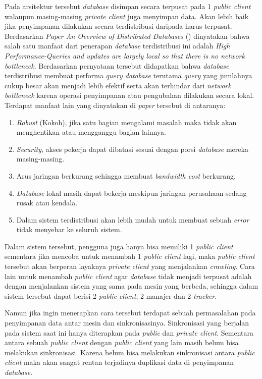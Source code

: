 Pada arsitektur tersebut \emph{database} disimpan secara terpusat pada 1 \emph{public 
client} walaupun masing-masing \emph{private client} juga menyimpan data. Akan 
lebih baik jika penyimpanan dilakukan secara terdistribusi daripada 
harus terpusat. Berdasarkan \emph{Paper An Overview of Distributed Databases} (\cite{overviewdistributed})
dinyatakan bahwa salah satu manfaat dari penerapan \emph{database} terdistribusi 
ini adalah \emph{High Performance-Queries and updates are largely local so that 
there is no network bottleneck}. Berdasarkan pernyataan tersebut didapatkan 
bahwa \emph{database} terdistribusi membuat performa \emph{query database} terutama \emph{query} 
yang jumlahnya cukup besar akan menjadi lebih efektif serta akan terhindar 
dari \emph{network bottleneck} karena operasi penyimpanan atau pengubahan dilakukan 
secara lokal. Terdapat manfaat lain yang dinyatakan di \emph{paper} tersebut 
di antaranya:
\begin{enumerate}
\setlength\itemsep{0pt}
  \setlength\topsep{0pt}
	\item{
		\emph{Robust} (Kokoh), jika satu bagian mengalami masalah maka tidak akan 
		menghentikan atau mengganggu bagian lainnya.
	}
	\item{
		\emph{Security}, akses pekerja dapat dibatasi sesuai dengan porsi \emph{database} 
		mereka masing-masing.
	}
	\item{
		Arus jaringan berkurang sehingga membuat \emph{bandwidth cost} berkurang.
	}
	\item{
		\emph{Database} lokal masih dapat bekerja meskipun jaringan perusahaan 
		sedang rusak atau kendala.
	}
	\item{
		Dalam sistem terdistribusi akan lebih mudah untuk membuat sebuah 
		\emph{error} tidak menyebar ke seluruh sistem.
	}
\end{enumerate}


Dalam sistem tersebut, pengguna juga hanya bisa memiliki 1 \emph{public client} 
sementara jika mencoba untuk menambah 1 \emph{public client} lagi, maka \emph{public 
client} tersebut akan berperan layaknya \emph{private client} yang menjalankan 
\emph{crawling}. Cara lain untuk menambah \emph{public client} agar \emph{database} tidak menjadi 
terpusat adalah dengan menjalankan sistem yang sama pada mesin yang berbeda, 
sehingga dalam sistem tersebut dapat berisi 2 \emph{public client}, 2 manajer 
dan 2 \emph{tracker}. 

Namun jika ingin menerapkan cara tersebut terdapat sebuah permasalahan pada 
penyimpanan data antar mesin dan sinkronisasinya. Sinkronisasi yang berjalan 
pada sistem saat ini hanya diterapkan pada \emph{public} dan \emph{private client}. 
Sementara antara sebuah \emph{public client} dengan \emph{public client} yang lain masih 
belum bisa melakukan sinkronisasi. Karena belum bisa melakukan sinkronisasi 
antara \emph{public client} maka akan sangat rentan terjadinya duplikasi data di 
penyimpanan \emph{database}.

